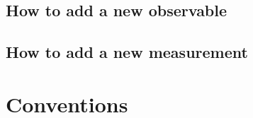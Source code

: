 \documentclass[
    paper=a4paper,
    DIV=15,
    BCRO=10mm,
    fontsize=11pt,
    bibliography=totoc
]{scrbook}
\begin{document}
\section{How to add a new observable}

\section{How to add a new measurement}

%
%
%
%
%
%
%
%
%
%
%
%
%
%
%
%
%

\appendix

\chapter{Conventions}



\backmatter

\printglossaries

\printbibliography
\end{document}
